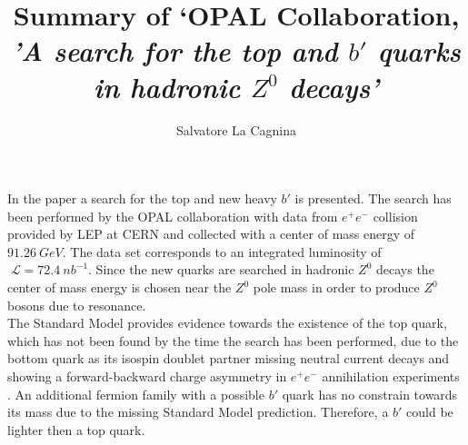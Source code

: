 \documentclass[11pt, twocolumn, a4paper]{article}
\begin{document}
\thispagestyle{empty}

\author{Salvatore La Cagnina}

\title{Summary of `OPAL Collaboration, {\it 'A search for the top and $b'$ quarks in hadronic $Z^0$ decays'}}

\maketitle

In the paper a search for the top and new heavy $b'$ is presented.
The search has been performed by the OPAL collaboration with data from $e^+ e^-$ collision provided by LEP at CERN and collected with a center of mass energy of $\SI{91.26}{GeV}$.
The data set corresponds to an integrated luminosity of ${\;\mathcal{L}=\SI{72.4}{nb^{-1}}}$.
Since the new quarks are searched in hadronic $Z^0$ decays the center of mass energy is chosen near the $Z^0$ pole mass in order to produce $Z^0$ bosons due to resonance.\\
The Standard Model provides evidence towards the existence of the top quark, which has not been found by the time the search has been performed, due to the bottom quark as its isospin doublet partner missing neutral current decays \cite{FCNC} and showing a forward-backward charge asymmetry in $e^+ e^-$ annihilation experiments \cite{NAROSKA198767}.
An additional fermion family with a possible $b'$ quark has no constrain towards its mass due to the missing Standard Model prediction.
Therefore, a $b'$ could be lighter then a top quark.
\end{document}

